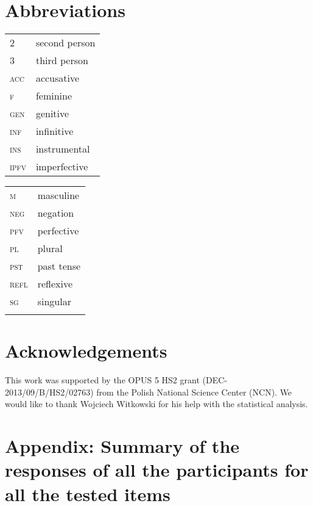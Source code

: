 \documentclass[output=paper]{langscibook}
\begin{document}
\section*{Abbreviations}

\begin{tabularx}{.5\textwidth}{@{}lX@{}}
\textsc{2}&second person\\
\textsc{3}&{third person}\\
\textsc{acc}&{accusative}\\
\textsc{f}&{feminine}\\
\textsc{gen}&{genitive}\\
\textsc{inf}&{infinitive}\\
\textsc{ins}&{instrumental}\\
\textsc{ipfv}&{imperfective}\\
\end{tabularx}%
\begin{tabularx}{.5\textwidth}{@{}lX@{}}
\textsc{m}&{masculine}\\
\textsc{neg}&{negation}\\
\textsc{pfv}&{perfective}\\
\textsc{pl}&{plural}\\
\textsc{pst}&{past tense}\\
\textsc{refl}&{reflexive}\\
\textsc{sg}&{singular}\\
\\
\end{tabularx}

\section*{Acknowledgements}

This work was supported by the OPUS 5 HS2 grant (DEC-2013/09/B/HS2/02763) from the Polish National Science Center (NCN). We would like to thank Wojciech Witkowski for his help with the statistical analysis.

\section*{Appendix: Summary of the responses of all the participants for all the tested items}
\end{document}

